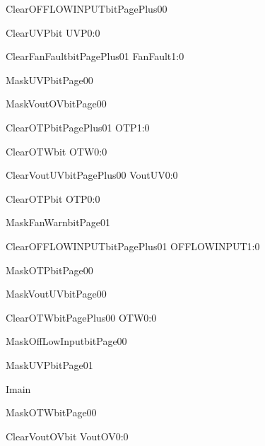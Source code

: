 \begin{labeling}{ClearOFFLOWINPUTbitPagePlus00}
\item [ClearUVPbit] UVP0:0
\item [ClearFanFaultbitPagePlus01] FanFault1:0
\item [MaskUVPbitPage00] 
\item [MaskVoutOVbitPage00] 
\item [ClearOTPbitPagePlus01] OTP1:0
\item [ClearOTWbit] OTW0:0
\item [ClearVoutUVbitPagePlus00] VoutUV0:0
\item [ClearOTPbit] OTP0:0
\item [MaskFanWarnbitPage01] 
\item [ClearOFFLOWINPUTbitPagePlus01] OFFLOWINPUT1:0
\item [MaskOTPbitPage00] 
\item [MaskVoutUVbitPage00] 
\item [ClearOTWbitPagePlus00] OTW0:0
\item [MaskOffLowInputbitPage00] 
\item [MaskUVPbitPage01] 
\item [Imain] 
\item [MaskOTWbitPage00] 
\item [ClearVoutOVbit] VoutOV0:0
\end{labeling}
